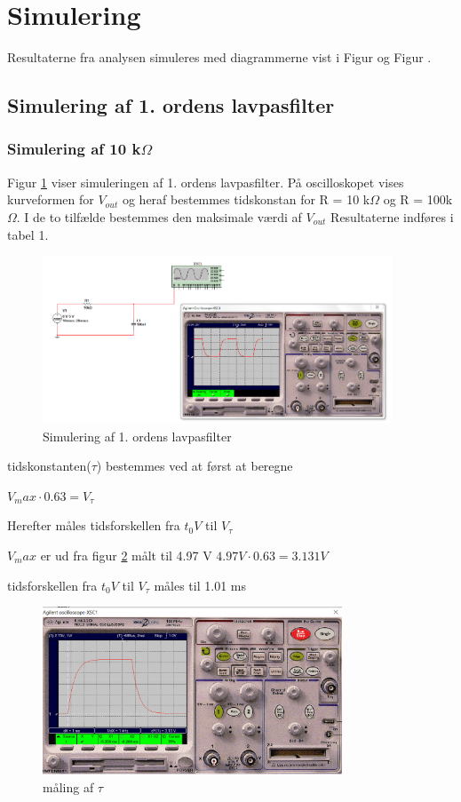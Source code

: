 \section{Simulering}
Resultaterne fra analysen simuleres med diagrammerne vist i Figur  og Figur . 

\subsection{Simulering af 1. ordens lavpasfilter}

\subsubsection{Simulering af 10 k$\Omega$ }
Figur \ref{1.orden} viser simuleringen af 1. ordens lavpasfilter. På oscilloskopet vises kurveformen for $V_{out}$ og heraf bestemmes tidskonstan for R = 10 k$\Omega$ og R = 100k$\Omega$.
I de to tilfælde bestemmes den maksimale værdi af $V_{out}$
Resultaterne indføres i tabel 1.

\begin{figure}[h!]
 \begin{center}
  \includegraphics[height=5cm]{P_Fig/figur1.png}
  \caption{Simulering af 1. ordens lavpasfilter}
  \label{1.orden}
 \end{center}
\end{figure}

tidskonstanten($\tau$) bestemmes ved at først at beregne 

$V_max \cdot 0.63 = V_{\tau}$

Herefter måles tidsforskellen fra $t_0 V$ til $V_{\tau}$

$V_max$ er ud fra figur \ref{10k.50Hz.tau} målt til 4.97 V
$4.97 V \cdot 0.63 = 3.131 V$

tidsforskellen fra $t_0 V$ til $V_{\tau}$ måles til 1.01 ms

\begin{figure}[h]
 \begin{center}
  \includegraphics[height=5cm]{P_Fig/figur3_10k_50Hz_tau.png}
  \caption{måling af $\tau$}
  \label{10k.50Hz.tau}
 \end{center}
\end{figure}


